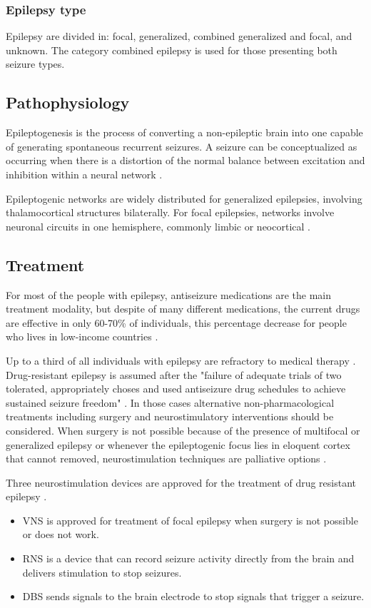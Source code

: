   \subsubsection*{Epilepsy type}
  Epilepsy are divided in: focal, generalized, combined generalized and focal, and unknown. The category combined epilepsy is used for those presenting both seizure types.

  \subsection*{Pathophysiology}
  Epileptogenesis is the process of converting a non-epileptic brain into one capable of generating spontaneous recurrent seizures. A seizure can be conceptualized as occurring when there is a distortion of the normal balance between excitation and inhibition within a neural network \cite{pathophysiology}. 
  
  Epileptogenic networks are widely distributed for generalized epilepsies, involving thalamocortical structures bilaterally. For focal epilepsies, networks involve neuronal circuits in one hemisphere, commonly limbic or neocortical \cite{classification}.

  \subsection*{Treatment}
  For most of the people with epilepsy, antiseizure medications are the main treatment modality, but despite of many different medications, the current drugs are effective in only 60-70\% of individuals, this percentage decrease for people who lives in low-income countries \cite{DUNCAN2006}.

  Up to a third of all individuals with epilepsy are refractory to medical therapy \cite{SpencerHuh2008}. Drug-resistant epilepsy is assumed after the "failure of adequate trials of two tolerated, appropriately choses and used antiseizure drug schedules to achieve sustained seizure freedom" \cite{drug_resist}. In those cases alternative non-pharmacological treatments including surgery and neurostimulatory interventions should be considered.
  When surgery is not possible because of the presence of multifocal or generalized epilepsy or whenever the epileptogenic focus lies in eloquent cortex that cannot removed, neurostimulation techniques are palliative options \cite{Englot2013}.

  Three neurostimulation devices are approved for the treatment of drug resistant epilepsy \cite{kiriakopoulos_cascino_britton_2018}.
  \begin{itemize}
    \item VNS is approved for treatment of focal epilepsy when surgery is not possible or does not work.
    \item RNS is a device that can record seizure activity directly from the brain and delivers stimulation to stop seizures.
    \item DBS sends signals to the brain electrode to stop signals that trigger a seizure.
  \end{itemize}

